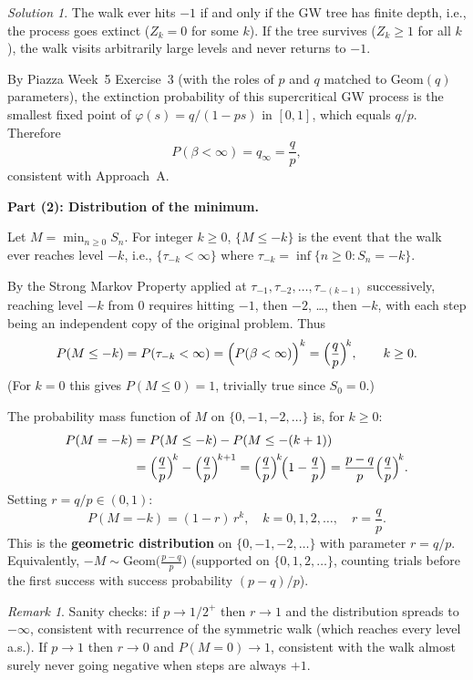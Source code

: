 \documentclass[12pt]{article}
\theoremstyle{remark}
\newtheorem*{solution}{Solution}
\newtheorem*{remark}{Remark}
\newcommand{\1}{\mathbf{1}}
\begin{document}
\begin{solution}
The walk ever hits $-1$ if and only if the GW tree has finite depth, i.e., the process
goes extinct ($Z_k = 0$ for some $k$).  If the tree survives ($Z_k \ge 1$ for all $k$),
the walk visits arbitrarily large levels and never returns to $-1$.

By Piazza Week~5 Exercise~3 (with the roles of $p$ and $q$ matched to $\mathrm{Geom}(q)$
parameters), the extinction probability of this supercritical GW process is the smallest
fixed point of $\varphi(s) = q/(1-ps)$ in $[0,1]$, which equals $q/p$.  Therefore
\[
  P(\beta < \infty) = q_\infty = \frac{q}{p},
\]
consistent with Approach~A.

\medskip\noindent\textbf{Part (2): Distribution of the minimum.}

Let $M = \min_{n \ge 0} S_n$.  For integer $k \ge 0$, $\{M \le -k\}$ is the event
that the walk ever reaches level $-k$, i.e., $\{\tau_{-k} < \infty\}$ where
$\tau_{-k} = \inf\{n \ge 0: S_n = -k\}$.

By the Strong Markov Property applied at $\tau_{-1}, \tau_{-2}, \ldots, \tau_{-(k-1)}$
successively, reaching level $-k$ from $0$ requires hitting $-1$, then $-2$, \ldots,
then $-k$, with each step being an independent copy of the original problem.  Thus
\[
  P(M \le -k) = P(\tau_{-k} < \infty) = \Bigl(P(\beta < \infty)\Bigr)^k = \Bigl(\frac{q}{p}\Bigr)^{\!k},
  \qquad k \ge 0.
\]
(For $k = 0$ this gives $P(M \le 0) = 1$, trivially true since $S_0 = 0$.)

The probability mass function of $M$ on $\{0, -1, -2, \ldots\}$ is, for $k \ge 0$:
\begin{align*}
  P(M = -k)
  &= P(M \le -k) - P(M \le -(k+1)) \\
  &= \Bigl(\frac{q}{p}\Bigr)^{\!k} - \Bigl(\frac{q}{p}\Bigr)^{\!k+1}
  = \Bigl(\frac{q}{p}\Bigr)^{\!k}\!\Bigl(1 - \frac{q}{p}\Bigr)
  = \frac{p-q}{p}\Bigl(\frac{q}{p}\Bigr)^{\!k}.
\end{align*}
Setting $r = q/p \in (0,1)$:
\[
  \boxed{P(M = -k) = (1-r)\,r^k, \quad k = 0, 1, 2, \ldots, \quad r = \frac{q}{p}.}
\]
This is the \textbf{geometric distribution} on $\{0, -1, -2, \ldots\}$ with parameter
$r = q/p$.  Equivalently, $-M \sim \mathrm{Geom}\!\bigl(\tfrac{p-q}{p}\bigr)$
(supported on $\{0, 1, 2, \ldots\}$, counting trials before the first success with
success probability $(p-q)/p$).

\begin{remark}
Sanity checks: if $p \to 1/2^+$ then $r \to 1$ and the distribution spreads to
$-\infty$, consistent with recurrence of the symmetric walk (which reaches every level
a.s.).  If $p \to 1$ then $r \to 0$ and $P(M = 0) \to 1$, consistent with the walk
almost surely never going negative when steps are always $+1$.
\end{remark}

\end{solution}
\end{document}
